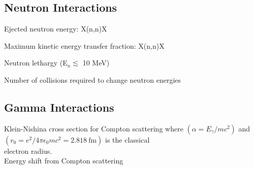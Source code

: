 \subsection{Neutron Interactions}


\noindent
Ejected neutron energy: X(n,n)X 

\noindent
Maximum kinetic energy transfer fraction: X(n,n)X 

\noindent
Neutron lethargy (E$_n \lesssim$ 10 MeV) 

\noindent
Number of collisions required to change neutron energies 

\subsection{Gamma Interactions}

\noindent
Klein-Nishina cross section for Compton scattering 
\indent where $(\alpha=E_\gamma/mc^2)$ and $(r_0=e^2/4\pi\epsilon_0mc^2=2.818~\mathrm{fm})$ is the classical \\ \indent electron radius.\\

\noindent
Energy shift from Compton scattering 


